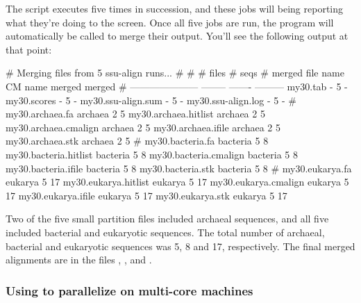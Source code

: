 
The script executes  five times in succession, and
these jobs will being reporting what they're doing to the screen. 
Once all five jobs are run, the  program will
automatically be called to merge their output. You'll see the
following output at that point:

\begin{sreoutput}
# Merging files from 5 ssu-align runs...
#
#                                  # files     # seqs
# merged file name       CM name    merged     merged
# ---------------------  --------  -------  ---------
  my30.tab               -               5          -
  my30.scores            -               5          -
  my30.ssu-align.sum     -               5          -
  my30.ssu-align.log     -               5          -
#
  my30.archaea.fa        archaea         2          5
  my30.archaea.hitlist   archaea         2          5
  my30.archaea.cmalign   archaea         2          5
  my30.archaea.ifile     archaea         2          5
  my30.archaea.stk       archaea         2          5
#
  my30.bacteria.fa       bacteria        5          8
  my30.bacteria.hitlist  bacteria        5          8
  my30.bacteria.cmalign  bacteria        5          8
  my30.bacteria.ifile    bacteria        5          8
  my30.bacteria.stk      bacteria        5          8
#
  my30.eukarya.fa        eukarya         5         17
  my30.eukarya.hitlist   eukarya         5         17
  my30.eukarya.cmalign   eukarya         5         17
  my30.eukarya.ifile     eukarya         5         17
  my30.eukarya.stk       eukarya         5         17
\end{sreoutput}

Two of the five small partition files included archaeal sequences, and
all five included bacterial and eukaryotic  sequences. The total number
of archaeal, bacterial and eukaryotic sequences was 5, 8 and 17,
respectively. The final merged alignments are in the files
, , and
.

\subsubsection{Using  to parallelize 
  on multi-core machines}


